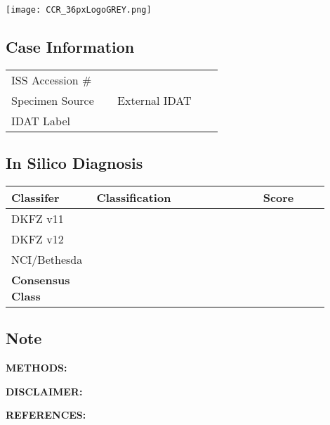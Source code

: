\documentclass[
	letterpaper, %
	10pt, %
]{CSSullivanBusinessReport}
\begin{document}

\thispagestyle{empty} %

\vspace*{-0.075\textheight} %

\hspace*{-0.55cm}\texttt{[image: CCR\_36pxLogoGREY.png]} %

{\fontsize{18pt}{20pt}\selectfont\raggedright\textbf{\reporttitle}\par} %

{\textit{\textbf{\reportsubtitle}}\par} %

{\reportdate\par} %

\subsection*{Case Information}

\begin{tabular}{@{} L{0.3\linewidth} L{0.3\linewidth} @{}} %
	\toprule
	ISS Accession \# & \\
	Specimen Source & External IDAT\\
	IDAT Label & \\
	\bottomrule
\end{tabular}

\subsection*{In Silico Diagnosis}
\begin{tabular}{@{} L{0.2\linewidth} L{0.5\linewidth} L{0.2\linewidth} @{}} %
    \textbf{Classifer} & \textbf{Classification} & \textbf{Score}\\
	\toprule
	DKFZ v11 &  & \\
	DKFZ v12 &  & \\
	NCI/Bethesda &  & \\
	\textbf{Consensus Class} & \textbf{}\\
	\bottomrule
\end{tabular}

\par
\subsection*{Note}


{\footnotesize
\textbf{METHODS:} 

\textbf{DISCLAIMER:} 

\textbf{REFERENCES:}\\ 
}
\end{document}
